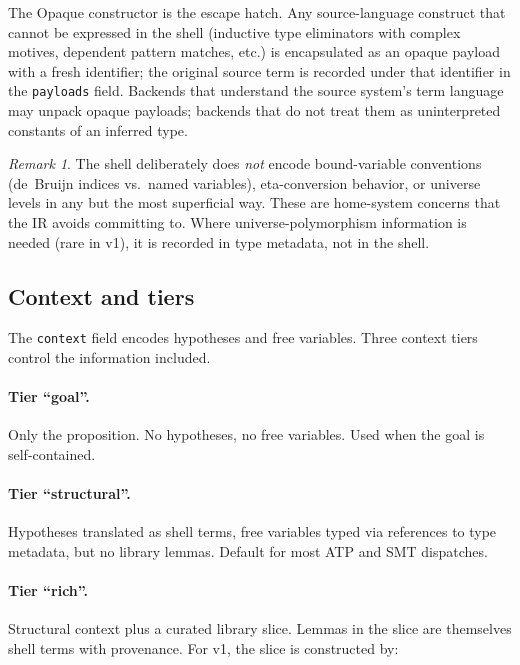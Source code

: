 \documentclass[11pt,letterpaper]{article}
\theoremstyle{definition}
\theoremstyle{remark}
\newtheorem*{remark}{Remark}
\begin{document}
The \textsf{Opaque} constructor is the escape hatch. Any source-language
construct that cannot be expressed in the shell (inductive type
eliminators with complex motives, dependent pattern matches, etc.) is
encapsulated as an opaque payload with a fresh identifier; the original
source term is recorded under that identifier in the \texttt{payloads}
field. Backends that understand the source system's term language may
unpack opaque payloads; backends that do not treat them as
uninterpreted constants of an inferred type.

\begin{remark}
The shell deliberately does \emph{not} encode bound-variable conventions
(de~Bruijn indices vs.\ named variables), eta-conversion behavior, or
universe levels in any but the most superficial way. These are
home-system concerns that the IR avoids committing to. Where
universe-polymorphism information is needed (rare in v1), it is recorded
in type metadata, not in the shell.
\end{remark}

\subsection{Context and tiers}
\label{sec:ir-tiers}

The \texttt{context} field encodes hypotheses and free variables. Three
context tiers control the information included.

\paragraph{Tier ``goal''.} Only the proposition. No hypotheses, no free
variables. Used when the goal is self-contained.

\paragraph{Tier ``structural''.} Hypotheses translated as shell terms,
free variables typed via references to type metadata, but no library
lemmas. Default for most ATP and SMT dispatches.

\paragraph{Tier ``rich''.} Structural context plus a curated library
slice. Lemmas in the slice are themselves shell terms with provenance.
For v1, the slice is constructed by:
\end{document}
